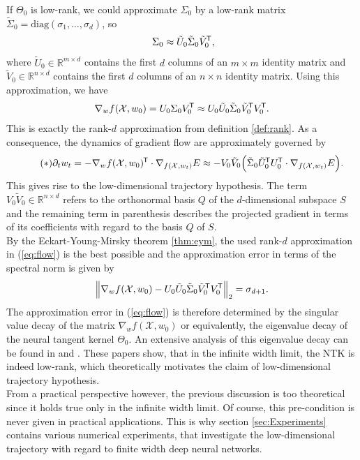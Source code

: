 \documentclass[11pt, a4paper]{article}
\newcommand{\R}{\mathbb{R}}
\newcommand{\X}{\mathcal{X}}
\newcommand*{\tr}{^{\mkern-1.5mu\mathsf{T}}}
\begin{document}
If $\Theta_0$ is low-rank, we could approximate $\Sigma_0$ by a low-rank matrix $\tilde{\Sigma}_0 = \text{diag}(\sigma_1, \dots, \sigma_d)$, so
\[ \Sigma_0 \approx \tilde{U}_0 \tilde{\Sigma}_0 \tilde{V}_0\tr , \]
where $\tilde{U}_0 \in \R^{m \times d}$ contains the first $d$ columns of an $m \times m$ identity matrix and $\tilde{V}_0 \in \R^{n \times d}$ contains the first $d$ columns of an $n \times n$ identity matrix. Using this approximation, we have
\[ \nabla_wf(\X,w_0) = U_0 \Sigma_0 V_0\tr \approx U_0 \tilde{U}_0 \tilde{\Sigma}_0 \tilde{V}_0\tr  V_0\tr . \]
This is exactly the rank-$d$ approximation from definition \ref{def:rank}. As a consequence, the dynamics of gradient flow are approximately governed by
\begin{equation} \label{eq:flow} \tag{$\ast$}
\partial_t w_t = -\nabla_wf(\X,w_0)\tr  \cdot \nabla_{f(\X,w_t)} E \approx - V_0 \tilde{V}_0 \Big ( \tilde{\Sigma}_0 \tilde{U}_0\tr  U_0\tr  \cdot \nabla_{f(\X,w_t)} E \Big ).
\end{equation}
This gives rise to the low-dimensional trajectory hypothesis. The term $V_0\tilde{V}_0 \in \R^{n \times d}$ refers to the orthonormal basis $Q$ of the $d$-dimensional subspace $S$ and the remaining term in parenthesis describes the projected gradient in terms of its coefficients with regard to the basis $Q$ of $S$. \\

By the Eckart-Young-Mirsky theorem \ref{thm:eym}, the used rank-$d$ approximation in (\ref{eq:flow}) is the best possible and the approximation error in terms of the spectral norm is given by
\[ \Big \| \nabla_wf(\X,w_0) - U_0 \tilde{U}_0 \tilde{\Sigma}_0 \tilde{V}_0\tr  V_0\tr \Big \|_2 = \sigma_{d+1}. \] 
The approximation error in (\ref{eq:flow}) is therefore determined by the singular value decay of the matrix $\nabla_wf(\X,w_0)$ or equivalently, the eigenvalue decay of the neural tangent kernel $\Theta_0$. An extensive analysis of this eigenvalue decay can be found in \cite{Decay1} and \cite{Decay2}. These papers show, that in the infinite width limit, the NTK is indeed low-rank, which theoretically motivates the claim of low-dimensional trajectory hypothesis. \\

From a practical perspective however, the previous discussion is too theoretical since it holds true only in the infinite width limit. Of course, this pre-condition is never given in practical applications. This is why section \ref{sec:Experiments} contains various numerical experiments, that investigate the low-dimensional trajectory with regard to finite width deep neural networks.
\end{document}
